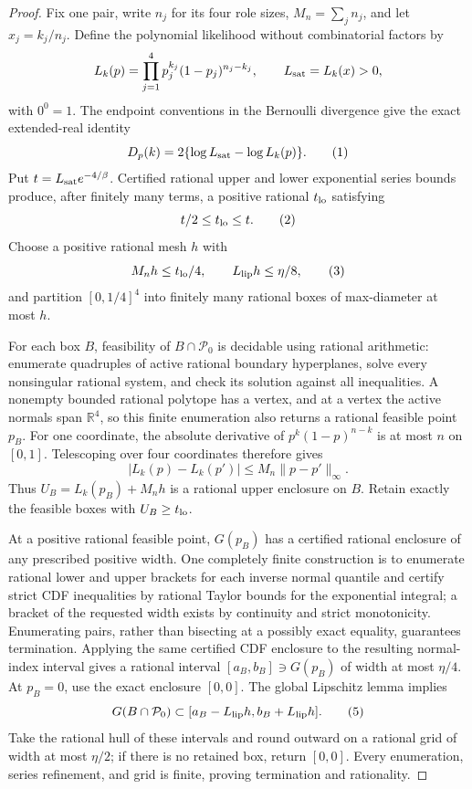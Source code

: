 \documentclass{article}
\begin{document}
\begin{proof}
Fix one pair, write \(n_j\) for its four role sizes, \(M_n=\sum_jn_j\), and let \(x_j=k_j/n_j\).  Define the polynomial likelihood without combinatorial factors by
\[
L_k(p)=\prod_{j=1}^4p_j^{k_j}(1-p_j)^{n_j-k_j},
\qquad
L_{\rm sat}=L_k(x)>0,
\]
with \(0^0=1\).  The endpoint conventions in the Bernoulli divergence give the exact extended-real identity
\[
D_p(k)=2\{\log L_{\rm sat}-\log L_k(p)\}.
\tag{1}
\]
Put \(t=L_{\rm sat}e^{-4/\beta}\).  Certified rational upper and lower exponential series bounds produce, after finitely many terms, a positive rational \(t_{\rm lo}\) satisfying
\[
t/2\le t_{\rm lo}\le t.
\tag{2}
\]
Choose a positive rational mesh \(h\) with
\[
M_nh\le t_{\rm lo}/4,
\qquad L_{\rm lip}h\le\eta/8,
\tag{3}
\]
and partition \([0,1/4]^4\) into finitely many rational boxes of max-diameter at most \(h\).

For each box \(B\), feasibility of \(B\cap\mathcal P_0\) is decidable using rational arithmetic: enumerate quadruples of active rational boundary hyperplanes, solve every nonsingular rational system, and check its solution against all inequalities.  A nonempty bounded rational polytope has a vertex, and at a vertex the active normals span \(\mathbb R^4\), so this finite enumeration also returns a rational feasible point \(p_B\).  For one coordinate, the absolute derivative of \(p^k(1-p)^{n-k}\) is at most \(n\) on \([0,1]\).  Telescoping over four coordinates therefore gives
\[
|L_k(p)-L_k(p')|\le M_n\|p-p'\|_\infty.
\tag{4}
\]
Thus \(U_B=L_k(p_B)+M_nh\) is a rational upper enclosure on \(B\).  Retain exactly the feasible boxes with \(U_B\ge t_{\rm lo}\).

At a positive rational feasible point, \(G(p_B)\) has a certified rational enclosure of any prescribed positive width.  One completely finite construction is to enumerate rational lower and upper brackets for each inverse normal quantile and certify strict CDF inequalities by rational Taylor bounds for the exponential integral; a bracket of the requested width exists by continuity and strict monotonicity.  Enumerating pairs, rather than bisecting at a possibly exact equality, guarantees termination.  Applying the same certified CDF enclosure to the resulting normal-index interval gives a rational interval \([a_B,b_B]\ni G(p_B)\) of width at most \(\eta/4\).  At \(p_B=0\), use the exact enclosure \([0,0]\).  The global Lipschitz lemma implies
\[
G(B\cap\mathcal P_0)\subset
[a_B-L_{\rm lip}h,b_B+L_{\rm lip}h].
\tag{5}
\]
Take the rational hull of these intervals and round outward on a rational grid of width at most \(\eta/2\); if there is no retained box, return \([0,0]\).  Every enumeration, series refinement, and grid is finite, proving termination and rationality.


\end{proof}
\end{document}
